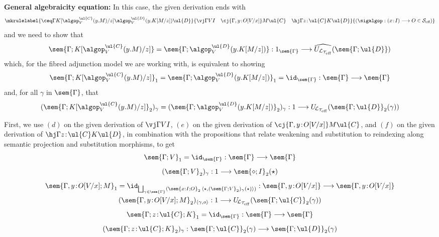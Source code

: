 \noindent\textbf{General algebraicity equation:} In this case, the given derivation ends with
\vspace{0.2cm}
\[
\mkrulelabel
{\ceq \Gamma {K[\algop^{\ul{C}}_V(y . M)/z]} {\algop^{\ul{D}}_V(y . K[M/z])} {\ul{D}}}
{
\vj \Gamma V {I} 
\quad 
\cj {\Gamma, y \!:\! O[V/x]} M {\ul{C}} 
\quad 
\hj \Gamma {z \!:\! \ul{C}} K {\ul{D}}}
{(\sigalgop : (x \!:\! I) \longrightarrow O \in \mathcal{S}_{\text{eff}})}
\]
and we need to show that
\[
\sem{\Gamma;{K[\algop^{\ul{C}}_V(y . M)/z]}} = \sem{\Gamma;{\algop^{\ul{D}}_V(y . K[M/z])}} : 1_{\sem{\Gamma}} \longrightarrow \widehat{U_{\mathcal{L}_{\mathcal{T}_{\text{eff}}}}}(\sem{\Gamma;\ul{D}})
\]
which, for the fibred adjunction model we are working with, is equivalent to showing 
\[
\sem{\Gamma;{K[\algop^{\ul{C}}_V(y . M)/z]}}_1 = \sem{\Gamma;{\algop^{\ul{D}}_V(y . K[M/z])}}_1 = \id_{\sem{\Gamma}} : \sem{\Gamma} \longrightarrow \sem{\Gamma}
\]
and, for all $\gamma$ in $\sem{\Gamma}$, that
\[
(\sem{\Gamma;{K[\algop^{\ul{C}}_V(y . M)/z]}}_2)_\gamma = (\sem{\Gamma;{\algop^{\ul{D}}_V(y . K[M/z])}}_2)_\gamma : 1 \longrightarrow U_{\!\mathcal{L}_{\mathcal{T}_{\text{eff}}}}(\sem{\Gamma;\ul{D}}_2(\gamma))
\]

First, we use $(d)$ on the given derivation of $\vj \Gamma V {I}$, $(e)$ on the given derivation of \linebreak $\cj {\Gamma, y \!:\! O[V/x]} M {\ul{C}}$, and $(f)$ on the given derivation of $\hj \Gamma {z \!:\! \ul{C}} K {\ul{D}}$, in combination with the propositions that relate weakening and substitution to reindexing along semantic projection and substitution morphisms, to get 
\[
\begin{array}{c}
\sem{\Gamma;V}_1 = \id_{\sem{\Gamma}} : \sem{\Gamma} \longrightarrow \sem{\Gamma}
\\[3mm]
(\sem{\Gamma;V}_2)_\gamma : 1 \longrightarrow \sem{\diamond; I}_2(\star)
\\[3mm]
\sem{\Gamma, y \!:\! O[V/x]; M}_1 = \id_{\bigsqcup_{\gamma \in \sem{\Gamma}} (\sem{x : I; O}_2\, \langle \star , (\sem{\Gamma;V}_2)_\gamma(\star) \rangle)} : \sem{\Gamma, y \!:\! O[V/x]} \longrightarrow \sem{\Gamma, y \!:\! O[V/x]}
\\[3mm]
(\sem{\Gamma, y \!:\! O[V/x]; M}_2)_{\langle \gamma, o \rangle} : 1 \longrightarrow U_{\!\mathcal{L}_{\mathcal{T}_{\text{eff}}}}(\sem{\Gamma;\ul{C}}_2(\gamma))
\\[3mm]
\sem{\Gamma; z \!:\! \ul{C}; K}_1 = \id_{\sem{\Gamma}} : \sem{\Gamma} \longrightarrow \sem{\Gamma}
\\[3mm]
(\sem{\Gamma; z \!:\! \ul{C}; K}_2)_\gamma : \sem{\Gamma;\ul{C}}_2(\gamma) \longrightarrow \sem{\Gamma;\ul{D}}_2(\gamma)
\end{array}
\]

